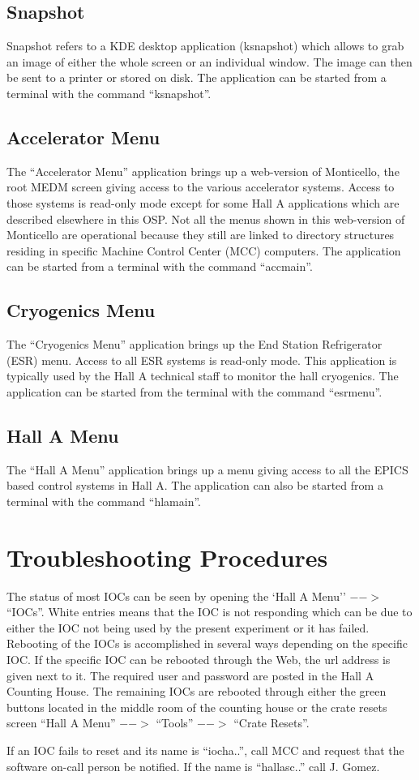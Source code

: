 {\subsection{Snapshot}
Snapshot refers to a KDE desktop application (ksnapshot) which allows to grab an image
of either the whole
screen or an individual window. The image can then be sent to a printer or stored on disk.
The application can be started from a terminal with the command ``ksnapshot''.

\subsection{Accelerator Menu}
The ``Accelerator Menu'' application brings up a web-version of Monticello,
the root MEDM screen giving access to the various accelerator systems. Access to those
systems is read-only mode except for some Hall A applications which are described elsewhere
in this OSP. Not all the menus shown in this web-version of Monticello are operational
because they still are linked to directory structures residing in specific
Machine Control Center (MCC) computers. The application can be started from a terminal with
the command ``accmain''.

\subsection{Cryogenics Menu}
The ``Cryogenics Menu'' application brings up the End Station
Refrigerator (ESR) menu. Access to all ESR systems is read-only mode. This application
is typically used by the Hall A technical staff to
monitor the hall cryogenics. The application can be started from the terminal with the command ``esrmenu''.

\subsection{Hall A Menu}
The ``Hall A Menu'' application brings up a menu giving access to all the EPICS based control systems in Hall A. The application can also be started from a terminal with the command ``hlamain''.

\section{Troubleshooting Procedures}
The status of most IOCs can be seen
by opening the `Hall A Menu'' $-->$ ``IOCs''. White entries means that the IOC
is not responding which can be due to either the IOC not being used by the present
experiment or it has failed. Rebooting of the IOCs is accomplished in several ways
depending on the specific IOC. If the specific IOC can be rebooted through the
Web, the url address is given next to it. The required user and password are
posted in the Hall A Counting House. The remaining IOCs are rebooted through
either the green buttons located in the middle room of the counting house
or the crate resets screen ``Hall A Menu'' $-->$ ``Tools'' $-->$ ``Crate Resets''.

If an IOC fails to reset and its name is ``iocha..'', call MCC and request that
the software on-call person be notified. If the name is ``hallasc..'' call J. Gomez.

}


